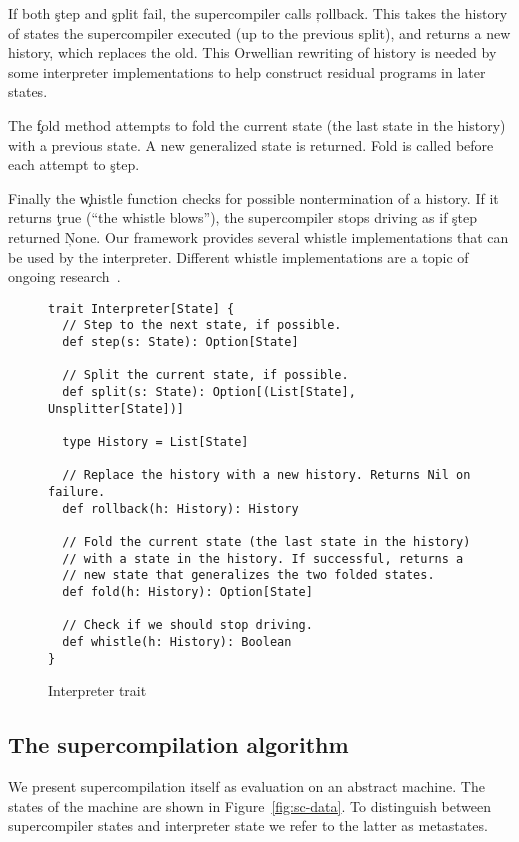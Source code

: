 If both \c{step} and \c{split} fail, the supercompiler calls \c{rollback}.
This takes the history of states the supercompiler executed (up to the
previous split), and returns a new history, which replaces the old.
This Orwellian rewriting of history is needed by some interpreter
implementations to help construct residual programs in later states.

The \c{fold} method attempts to fold the current state (the last
state in the history) with a previous state. A new generalized state
is returned. Fold is called before each attempt to \c{step}.

Finally the \c{whistle} function checks for possible nontermination
of a history.
If it returns \c{true} (``the whistle blows''), the supercompiler stops driving as if \c{step}
returned \c{None}. Our framework provides several whistle implementations
that can be used by the interpreter. Different whistle implementations are
a topic of ongoing research~\cite{whistles64}.

\begin{figure*}
  \begin{verbatim}
trait Interpreter[State] {
  // Step to the next state, if possible.
  def step(s: State): Option[State]

  // Split the current state, if possible.
  def split(s: State): Option[(List[State], Unsplitter[State])]

  type History = List[State]

  // Replace the history with a new history. Returns Nil on failure.
  def rollback(h: History): History

  // Fold the current state (the last state in the history)
  // with a state in the history. If successful, returns a
  // new state that generalizes the two folded states.
  def fold(h: History): Option[State]

  // Check if we should stop driving.
  def whistle(h: History): Boolean
}
  \end{verbatim}
  \caption{Interpreter trait}
  \label{fig:interpreter}
\end{figure*}

\subsection{The supercompilation algorithm}

We present supercompilation itself as evaluation on an abstract machine.
The states of the machine are shown in Figure~\ref{fig:sc-data}.
To distinguish between supercompiler states and interpreter state we refer
to the latter as metastates.

